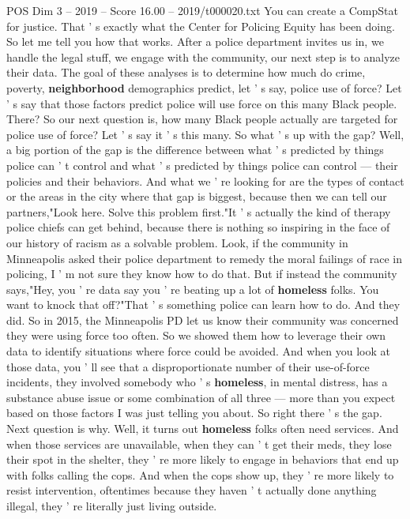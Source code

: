\begin{textsample}{POS Dim 3 – 2019 – Score 16.00 – 2019/t000020.txt}
You can create a CompStat for justice.
That ' s exactly what the Center for Policing Equity has been doing.
So let me tell you how that works.
After a police department invites us in, we handle the legal stuff, we engage with the community, our next step is to analyze their data.
The goal of these analyses is to determine how much do crime, poverty, \textbf{neighborhood} demographics predict, let ' s say, police use of force?
Let ' s say that those factors predict police will use force on this many Black people.
There?
So our next question is, how many Black people actually are targeted for police use of force?
Let ' s say it ' s this many.
So what ' s up with the gap?
Well, a big portion of the gap is the difference between what ' s predicted by things police can ' t control and what ' s predicted by things police can control — their policies and their behaviors.
And what we ' re looking for are the types of contact or the areas in the city where that gap is biggest, because then we can tell our partners,"Look here.
Solve this problem first."It ' s actually the kind of therapy police chiefs can get behind, because there is nothing so inspiring in the face of our history of racism as a solvable problem.
Look, if the community in Minneapolis asked their police department to remedy the moral failings of race in policing, I ' m not sure they know how to do that.
But if instead the community says,"Hey, you ' re data say you ' re beating up a lot of \textbf{homeless} folks.
You want to knock that off?"That ' s something police can learn how to do.
And they did.
So in 2015, the Minneapolis PD let us know their community was concerned they were using force too often.
So we showed them how to leverage their own data to identify situations where force could be avoided.
And when you look at those data, you ' ll see that a disproportionate number of their use-of-force incidents, they involved somebody who ' s \textbf{homeless}, in mental distress, has a substance abuse issue or some combination of all three — more than you expect based on those factors I was just telling you about.
So right there ' s the gap.
Next question is why.
Well, it turns out \textbf{homeless} folks often need services.
And when those services are unavailable, when they can ' t get their meds, they lose their spot in the shelter, they ' re more likely to engage in behaviors that end up with folks calling the cops.
And when the cops show up, they ' re more likely to resist intervention, oftentimes because they haven ' t actually done anything illegal, they ' re literally just living outside.

\end{textsample}
